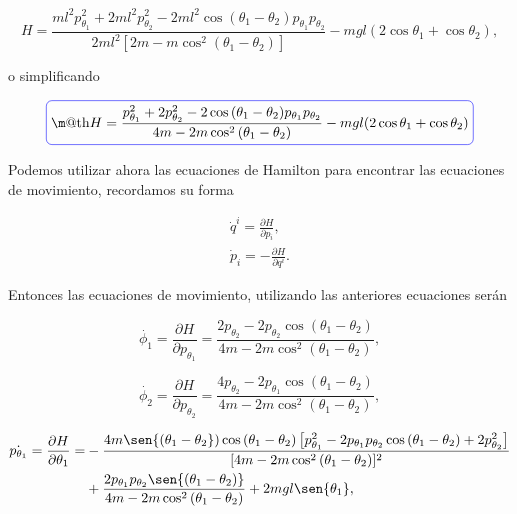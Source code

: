 \documentclass[a4paper,10pt]{article}
\makeatletter
\numberwithin{equation}{section}
\newcommand*{\boxcolor}{blue}
\renewcommand{\boxed}[1]{\textcolor{\boxcolor}{%
\tikz[baseline={([yshift=-1ex]current bounding box.center)}] \node [rectangle, minimum width=1ex,rounded corners,draw] {\normalcolor\m@th$\displaystyle#1$};}}
\makeatother
\begin{document}
\begin{equation}
 H = \frac{ml^2p_{\theta_1}^2 + 2ml^2p_{\theta_2}^2 - 
 2ml^2\cos{(\theta_1 - \theta_2)p_{\theta_1}p_{\theta_2}}}{2ml^2[2m - 
 m\cos^2{(\theta_1 - \theta_2)}]} - mgl(2\cos{\theta_1} + \cos{\theta_2}),
\end{equation}

o simplificando 

\begin{equation}
 \boxed{H = \frac{p_{\theta_1}^2 + 2p_{\theta_2}^2 - 
 2\cos{(\theta_1 - \theta_2)p_{\theta_1}p_{\theta_2}}}{4m - 
 2m\cos^2{(\theta_1 - \theta_2)}} - mgl(2\cos{\theta_1} + \cos{\theta_2})}
\end{equation}

Podemos utilizar ahora las ecuaciones de Hamilton para encontrar las ecuaciones de 
movimiento, recordamos su forma

\begin{align}
 \dot{q}^i = \frac{\partial H}{\partial p_i}, \\
 \dot{p}_i = - \frac{\partial H}{\partial q^i}.
\end{align}

Entonces las ecuaciones de movimiento, utilizando las anteriores ecuaciones serán

\begin{equation}
 \dot{\phi_1} =  \frac{\partial H}{\partial p_{\theta_1}} = 
 \frac{2p_{\theta_2} - 2p_{\theta_2}\cos{(\theta_1 - \theta_2)}}{4m - 
 2m\cos^2{(\theta_1 - \theta_2)}},
\end{equation}

\begin{equation}
 \dot{\phi_2} =  \frac{\partial H}{\partial p_{\theta_2}} = 
 \frac{4p_{\theta_2} - 2p_{\theta_1}\cos{(\theta_1 - \theta_2)}}{4m - 
 2m\cos^2{(\theta_1 - \theta_2)}},
\end{equation}

\begin{align}
\begin{split}
 \dot{p_{\theta_1}} = \frac{\partial H}{\partial \theta_1} = 
 &- \frac{4m\sen{(\theta_1 - \theta_2})\cos{(\theta_1 - \theta_2)}
 \left[p_{\theta_1}^2 - 2p_{\theta_1}p_{\theta_2}\cos{(\theta_1 - \theta_2)} + 2p_{\theta_2}^2\right]}{[4m - 2m\cos^2{(\theta_1 - \theta_2)}]^2} \\
 &+ \frac{2p_{\theta_1}p_{\theta_2}\sen{(\theta_1 - \theta_2)}}{4m - 2m\cos^2{(\theta_1 - \theta_2)}} 
 + 2mgl\sen{\theta_1},
\end{split}
\end{align}
\end{document}
